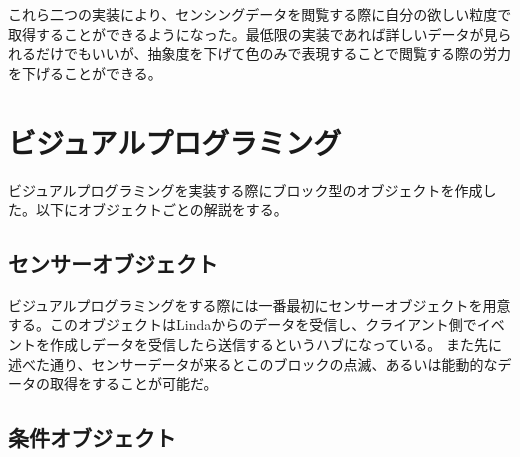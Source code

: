 これら二つの実装により、センシングデータを閲覧する際に自分の欲しい粒度で取得することができるようになった。最低限の実装であれば詳しいデータが見られるだけでもいいが、抽象度を下げて色のみで表現することで閲覧する際の労力を下げることができる。

\section{ビジュアルプログラミング}

ビジュアルプログラミングを実装する際にブロック型のオブジェクトを作成した。以下にオブジェクトごとの解説をする。

\subsection{センサーオブジェクト}

ビジュアルプログラミングをする際には一番最初にセンサーオブジェクトを用意する。このオブジェクトはLindaからのデータを受信し、クライアント側でイベントを作成しデータを受信したら送信するというハブになっている。
また先に述べた通り、センサーデータが来るとこのブロックの点滅、あるいは能動的なデータの取得をすることが可能だ。

\subsection{条件オブジェクト}

